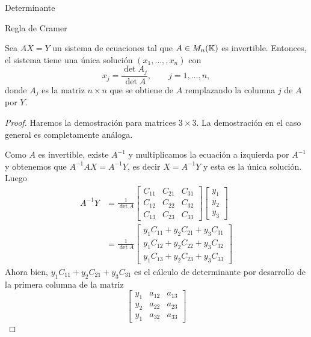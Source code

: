 \begin{chapter}{Determinante}
\begin{section}{Regla de Cramer}
    \begin{teorema} Sea $AX=Y$ un sistema de ecuaciones tal que $A \in M_n(\mathbb K)$ es invertible. Entonces, el sistema tiene una única solución $(x_1,\ldots,,x_n)$ con
        \begin{equation*}
            x_j = \frac{\det A_j}{\det A},\qquad j=1,\ldots,n,
        \end{equation*}
        donde $A_j$ es la matriz $n \times n$ que se obtiene de $A$ remplazando la columna $j$ de
        $A$ por $Y$.
    \end{teorema}
    \begin{proof}
        Haremos la demostración para matrices $3 \times 3$. La demostración en el caso general es completamente análoga.

        Como $A$  es invertible, existe $A^{-1}$ y multiplicamos la ecuación a izquierda por $A^{-1}$ y obtenemos que $A^{-1}A X = A^{-1}Y$,  es decir $X = A^{-1}Y$ y esta es la única solución. Luego
        \begin{align*}
            A^{-1}Y & = \frac{1}{\det A}
            \begin{bmatrix} C_{11} & C_{21} & C_{31} \\
                  C_{12} & C_{22} & C_{32} \\
                  C_{13} & C_{23} & C_{33}\end{bmatrix}
            \begin{bmatrix} y_1 \\ y_2 \\ y_3 \end{bmatrix}                                      \\
                    & = \frac{1}{\det A}\begin{bmatrix} y_1C_{11}+  y_2C_{21} + y_3C_{31}  \\
                                            y_1C_{12}+  y_2C_{22}+   y_3C_{32} \\
                                            y_1C_{13}+  y_2C_{23}+  y_3C_{33}\end{bmatrix} \tag{$*$}
        \end{align*}
        Ahora bien,  $y_1C_{11}+  y_2C_{21}+   y_3C_{31}$ es el cálculo de determinante por desarrollo de la primera columna de la matriz
        $$
            \begin{bmatrix}
                y_1 & a_{12} & a_{13} \\y_2 & a_{22} & a_{23} \\y_1 & a_{32} & a_{33}

\end{bmatrix}$$
\end{proof}
\end{section}
\end{chapter}
